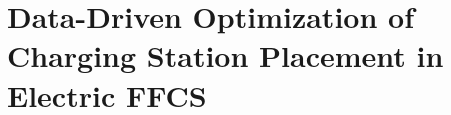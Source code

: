 
\chapter{Data-Driven Optimization of Charging Station Placement in Electric FFCS}
\label{chap:7_cs_optimization}
	\graphicspath{{Chapter7/}}













%





